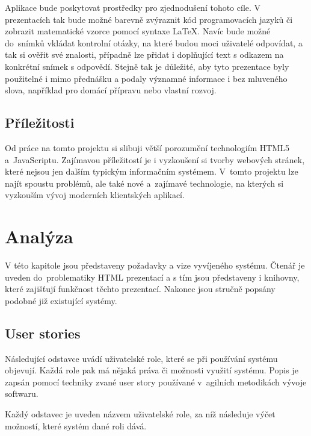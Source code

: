 \documentclass[11pt,twoside,a4paper]{book}
\newcommand*{\nom}[2]{#1\nomenclature{#1}{#2}} 			%
\begin{document}
Aplikace bude poskytovat prostředky pro zjednodušení tohoto cíle. V prezentacích tak bude možné barevně zvýraznit kód programovacích jazyků či zobrazit matematické vzorce pomocí syntaxe \LaTeX. Navíc bude možné do~snímků vkládat kontrolní otázky, na které budou moci uživatelé odpovídat, a tak si ověřit své znalosti, případně lze přidat i doplňující text s odkazem na konkrétní snímek s odpovědí. Stejně tak je důležité, aby tyto prezentace byly použitelné i mimo přednášku a podaly významné informace i bez mluveného slova, například pro domácí přípravu nebo vlastní rozvoj. 

\section{Příležitosti}
Od práce na tomto projektu si slibuji větší porozumění technologiím HTML5 a~Java\-Scriptu. Zajímavou příležitostí je i vyzkoušení si tvorby webových stránek, které nejsou jen dalším typickým informačním systémem. V~tomto projektu lze najít spoustu problémů, ale také nové a~zajímavé technologie, na kterých si vyzkouším vývoj moderních klientských aplikací.




\chapter{Analýza}
V této kapitole jsou představeny požadavky a vize vyvíjeného systému. Čtenář je uveden do~problematiky \nom{HTML}{HyperText Markup Language} prezentací a s tím jsou představeny i knihovny, které zajišťují funkčnost těchto prezentací. Nakonec jsou stručně popsány podobné již existující systémy.


\section{User stories}\label{chap:userstory}
Následující odstavce uvádí uživatelské role, které se při používání systému objevují. Každá role pak má nějaká práva či možnosti využití systému. Popis je zapsán pomocí techniky zvané user story používané v~agilních metodikách vývoje softwaru.

Každý odstavec je uveden názvem uživatelské role, za níž následuje výčet možností, které systém dané roli dává. \\\\
\end{document}
